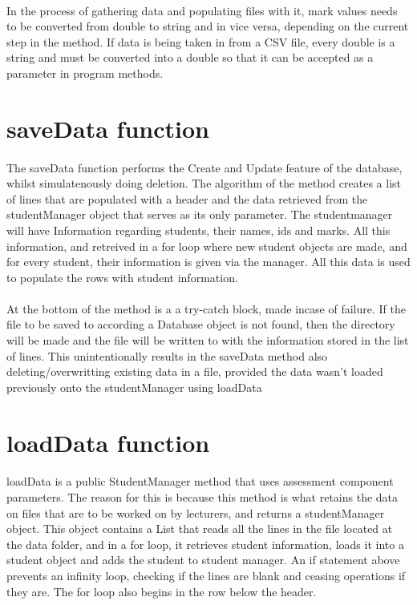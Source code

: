 \paragraph{}
In the process of gathering data and populating files with it, mark values needs to be 
converted from double to string and in vice versa, depending on the current step in the method.
If data is being taken in from a CSV file, every double is a string and must be converted into a double 
so that it can be accepted as a parameter in program methods.

\section{saveData function}
\paragraph{}
The saveData function performs the Create and Update feature of the database, whilst simulatenously doing deletion.
The algorithm of the method creates a list of lines that are populated with a header and the data 
retrieved from the studentManager object that serves as its only parameter. The studentmanager will have Information 
regarding students, their names, ids and marks. All this information, and retreived in a for loop where 
new student objects are made, and for every student, their information is given via the manager.
All this data is used to populate the rows with student information.

\paragraph{}
At the bottom of the method is a a try-catch block, made incase of failure. If the file to be saved to according a 
Database object is not found, then the directory will be made and the file will be written to 
with the information stored in the list of lines. This unintentionally results in the saveData method also 
deleting/overwritting existing data in a file, provided the data wasn't loaded previously onto the studentManager using 
loadData

\section{loadData function}
\paragraph{}
loadData is a public StudentManager method that uses assessment component parameters.
The reason for this is because this method is what retains the data on files that are to be worked on 
by lecturers, and returns a studentManager object. This object contains a List that reads all the lines in the file 
located at the data folder, and in a for loop, it retrieves student information, loads it into a student object and 
adds the student to student manager. An if statement above prevents an infinity loop, checking if the lines are blank and 
ceasing operations if they are. The for loop also begins in the row below the header.

